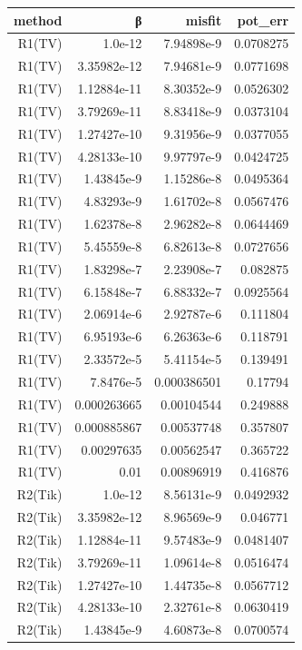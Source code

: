 \begin{tabular}{rrrr}
  \toprule
  \textbf{method} & \textbf{β} & \textbf{misfit} & \textbf{pot\_err} \\
  \midrule
  R1(TV) & 1.0e-12 & 7.94898e-9 & 0.0708275 \\
  R1(TV) & 3.35982e-12 & 7.94681e-9 & 0.0771698 \\
  R1(TV) & 1.12884e-11 & 8.30352e-9 & 0.0526302 \\
  R1(TV) & 3.79269e-11 & 8.83418e-9 & 0.0373104 \\
  R1(TV) & 1.27427e-10 & 9.31956e-9 & 0.0377055 \\
  R1(TV) & 4.28133e-10 & 9.97797e-9 & 0.0424725 \\
  R1(TV) & 1.43845e-9 & 1.15286e-8 & 0.0495364 \\
  R1(TV) & 4.83293e-9 & 1.61702e-8 & 0.0567476 \\
  R1(TV) & 1.62378e-8 & 2.96282e-8 & 0.0644469 \\
  R1(TV) & 5.45559e-8 & 6.82613e-8 & 0.0727656 \\
  R1(TV) & 1.83298e-7 & 2.23908e-7 & 0.082875 \\
  R1(TV) & 6.15848e-7 & 6.88332e-7 & 0.0925564 \\
  R1(TV) & 2.06914e-6 & 2.92787e-6 & 0.111804 \\
  R1(TV) & 6.95193e-6 & 6.26363e-6 & 0.118791 \\
  R1(TV) & 2.33572e-5 & 5.41154e-5 & 0.139491 \\
  R1(TV) & 7.8476e-5 & 0.000386501 & 0.17794 \\
  R1(TV) & 0.000263665 & 0.00104544 & 0.249888 \\
  R1(TV) & 0.000885867 & 0.00537748 & 0.357807 \\
  R1(TV) & 0.00297635 & 0.00562547 & 0.365722 \\
  R1(TV) & 0.01 & 0.00896919 & 0.416876 \\
  R2(Tik) & 1.0e-12 & 8.56131e-9 & 0.0492932 \\
  R2(Tik) & 3.35982e-12 & 8.96569e-9 & 0.046771 \\
  R2(Tik) & 1.12884e-11 & 9.57483e-9 & 0.0481407 \\
  R2(Tik) & 3.79269e-11 & 1.09614e-8 & 0.0516474 \\
  R2(Tik) & 1.27427e-10 & 1.44735e-8 & 0.0567712 \\
  R2(Tik) & 4.28133e-10 & 2.32761e-8 & 0.0630419 \\
  R2(Tik) & 1.43845e-9 & 4.60873e-8 & 0.0700574 \\

\end{tabular}
